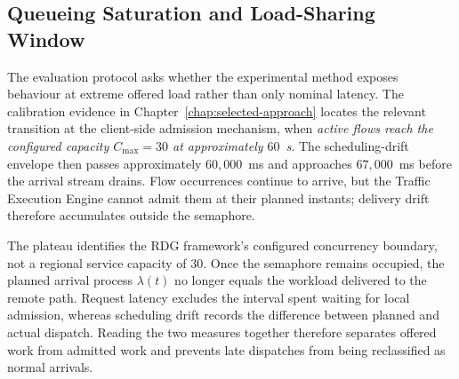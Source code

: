 \subsection[Queueing Saturation and Load-Sharing Window]{Queueing Saturation and Load-Sharing Window}
\label{subsec:conclusions-queueing-saturation}

\noindent The evaluation protocol asks whether the experimental method exposes
behaviour at extreme offered load rather than only nominal latency. The
calibration evidence in Chapter~\ref{chap:selected-approach} locates the
relevant transition at the client-side admission mechanism, when
\emph{active flows reach the configured capacity $C_{\max}=30$ at approximately
$60$~s}. The scheduling-drift envelope then passes approximately
$60{,}000$~ms and approaches $67{,}000$~ms before the arrival stream drains.
Flow occurrences continue to arrive, but the Traffic Execution Engine cannot admit them at
their planned instants; delivery drift therefore accumulates outside the
semaphore.

\noindent The plateau identifies the RDG framework's configured concurrency boundary, not
a regional service capacity of $30$. Once the semaphore remains occupied, the
planned arrival process $\lambda(t)$ no longer equals the workload delivered to
the remote path. Request latency excludes the interval spent waiting for local
admission, whereas scheduling drift records the difference between planned and
actual dispatch. Reading the two measures together therefore separates offered
work from admitted work and prevents late dispatches from being reclassified as
normal arrivals.

